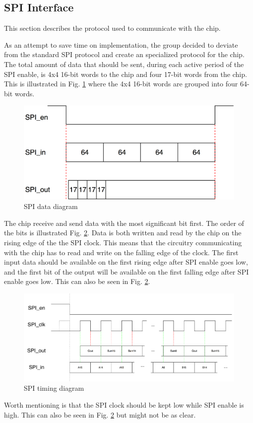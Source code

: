 
 \newpage
\subsection{SPI Interface}
This section describes the protocol used to communicate with the chip.

As an attempt to save time on implementation, the group decided to deviate from the standard SPI protocol and create an specialized protocol for the chip.
The total amount of data that should be sent, during each active period of the SPI enable, is 4x4 16-bit words to the chip and four 17-bit words from the chip. This is illustrated in Fig. \ref{spi_data} where the 4x4 16-bit words are grouped into four 64-bit words.

\begin{figure}[H]
\centering
\captionsetup{justification=centering}
\includegraphics[scale=0.2]{../figures/spi_data.png}
\caption{SPI data diagram}
\label{spi_data}
\end{figure}

The chip receive and send data with the most significant bit first. The order of the bits is illustrated Fig. \ref{spi_int}. Data is both written and read by the chip on the rising edge of the the SPI clock. This means that the circuitry communicating with the chip has to read and write on the falling edge of the clock. The first input data should be available on the first rising edge after SPI enable goes low, and the first bit of the output will be available on the first falling edge after SPI enable goes low. This can also be seen in Fig. \ref{spi_int}.\\

\begin{figure}[H]
\centering
\captionsetup{justification=centering}
\includegraphics[scale=0.1]{../figures/spi_interface.png}
\caption{SPI timing diagram}
\label{spi_int}
\end{figure} 


Worth mentioning is that the SPI clock should be kept low while SPI enable is high. This can also be seen in Fig. \ref{spi_int} but might not be as clear.

